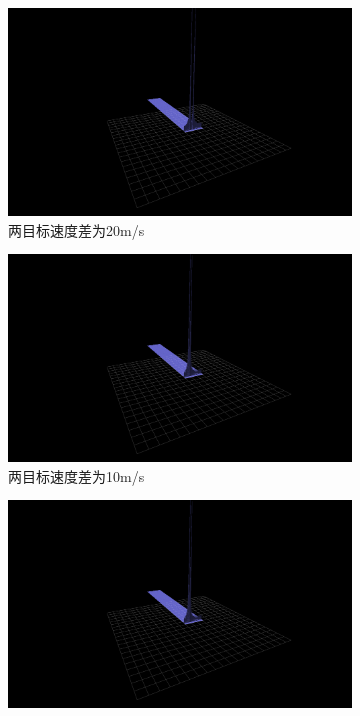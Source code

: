 \documentclass{article}
\newcounter{sub}
\begin{document}
\begin{figure}[H]
	\centering
	\begin{subfigure}[H]{.45\linewidth}
		\centering
		\includegraphics[width=\linewidth]{vector20-MTD-software.png}
		\caption{两目标速度差为20m/s}
		\label{fig:两目标速度差为20m/s}
	\end{subfigure}
	\quad
	\begin{subfigure}[H]{.45\linewidth}
		\centering
		\includegraphics[width=\linewidth]{vector10-MTD-software.png}
		\caption{两目标速度差为10m/s}
		\label{fig:两目标速度差为10m/s}
	\end{subfigure}
	\quad
	\begin{subfigure}[H]{.45\linewidth}
		\centering
		\includegraphics[width=\linewidth]{vector4-MTD-software.png}

\end{subfigure}
\end{figure}
\end{document}
